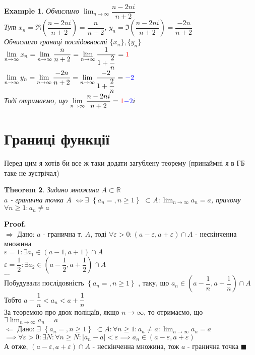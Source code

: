 \documentclass[a4paper, 14pt]{extarticle}
\def\huge{\displaystyle}
\def\bigline{\vspace{5mm}\\}
\def\rightproof{$\boxed{\Rightarrow}$ }
\def\leftproof{$\boxed{\Leftarrow}$ }
\newcommand{\sequence}[2][{}]{%
\ifthenelse{\equal{#1}{}}{$\{{#2}, n \geq 1 \}$}
{$\huge \left\{ {#2} = {#1}, n \geq 1 \right\}$}%
}
\theoremstyle{theoremdd}
\newtheorem{theorem}{Theorem}[subsection]
\theoremstyle{theoremdd}
\theoremstyle{theoremdd}
\theoremstyle{theoremdd}
\newtheorem{example}[theorem]{Example}
\theoremstyle{theoremdd}
\theoremstyle{theoremdd}
\theoremstyle{theoremdd}
\theoremstyle{theoremdd}
\newenvironment{pf}{\vspace*{-3mm} \textbf{Proof. \\}}{$\blacksquare$}
\begin{document}
	\begin{example}
	Обчислимо $\huge \lim_{n \to \infty} \dfrac{n-2ni}{n+2}$\\
	Тут $x_n = \Re \left(\dfrac{n-2ni}{n+2} \right) = \dfrac{n}{n+2}$, \hspace{1cm} $y_n = \Im \left( \dfrac{n-2ni}{n+2} \right) = \dfrac{-2n}{n+2}$\\
	Обчислимо границі послідовності $\{x_n\}, \{y_n\}$\\
	$\huge \lim_{n \to \infty} x_n = \lim_{n \to \infty} \dfrac{n}{n+2} = \lim_{n \to \infty} \dfrac{1}{1 + \dfrac{2}{n}} = \textcolor{red}{1}$\\
	$\huge \lim_{n \to \infty} y_n = \lim_{n \to \infty} \dfrac{-2n}{n+2} = \lim_{n \to \infty} \dfrac{-2}{1 + \dfrac{2}{n}} = \textcolor{blue}{-2}$\\
	Тоді отримаємо, що $\huge \lim_{n \to \infty} \dfrac{n-2ni}{n+2} = \textcolor{red}{1} \textcolor{blue}{-2}i$
	\end{example}
	\newpage

	
	\section{Границі функції}
	Перед цим я хотів би все ж таки додати загублену теорему (принаймні я в ГБ таке не зустрічал)
	\begin{theorem}
	Задано множина $A \subset \mathbb{R}$\\
	$a$ - гранична точка $A$ $\iff \exists$ \sequence{a_n} $\subset A: \huge \lim_{n \to \infty} a_n = a$, причому $\forall n \geq 1: a_n \neq a$
	\end{theorem}
	
	\begin{pf}
	\rightproof Дано: $a$ - гранична т. $A$, тоді $\forall \varepsilon > 0: (a-\varepsilon, a + \varepsilon) \cap A$ - нескінченна множина\\
	$\varepsilon = 1: \exists a_1 \in (a-1,a+1) \cap A$\\
	$\varepsilon = \dfrac{1}{2}: \exists a_2 \in (a-\dfrac{1}{2}, a+\dfrac{1}{2}) \cap A$\\
	$\dots$\\
	Побудували послідовність \sequence{a_n}, таку, що $a_n \in (a-\dfrac{1}{n}, a+\dfrac{1}{n}) \cap A$\\
	Тобто $a - \dfrac{1}{n} < a_n < a + \dfrac{1}{n}$\\
	За теоремою про двох поліцаїв, якщо $n \to \infty$, то отримаємо, що \\ $\exists \huge \lim_{n \to \infty} a_n = a$
	\bigline
	
	\leftproof Дано: $\exists$ \sequence{a_n} $\subset A: \forall n \geq 1: a_n \neq a: \huge \lim_{n \to \infty} a_n = a$\\
	$\implies \forall \varepsilon > 0: \exists N: \forall n \geq N: |a_n-a|<\varepsilon \implies a_n \in (a-\varepsilon,a+\varepsilon)$\\
	А отже, $(a-\varepsilon,a+\varepsilon) \cap A$ - нескінченна множина, тож $a$ - гранична точка
	\end{pf}
\end{document}
